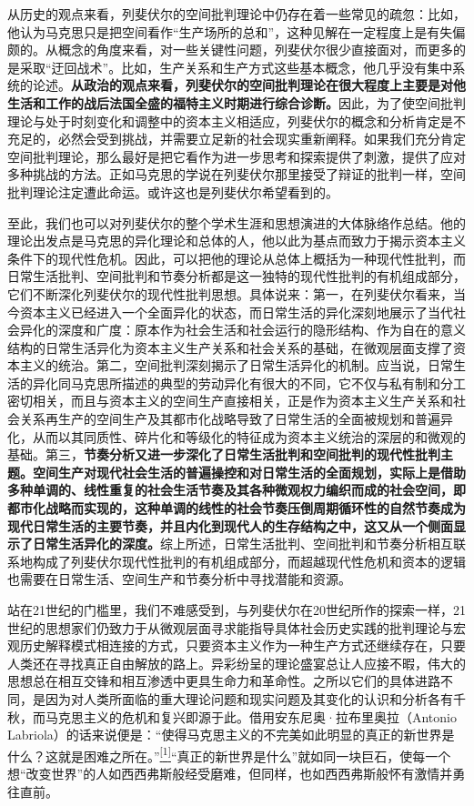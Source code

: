 \documentclass[UTF8, fontset = sourcesans, a4paper, oneside, zihao =
-4, scheme=chinese, no-math, space=true]{ctexbook}
\begin{document}
从历史的观点来看，列斐伏尔的空间批判理论中仍存在着一些常见的疏忽：比如，他认为马克思只是把空间看作``生产场所的总和''，这种见解在一定程度上是有失偏颇的。从概念的角度来看，对一些关键性问题，列斐伏尔很少直接面对，而更多的是采取``迂回战术''。比如，生产关系和生产方式这些基本概念，他几乎没有集中系统的论述。\textbf{从政治的观点来看，列斐伏尔的空间批判理论在很大程度上主要是对他生活和工作的战后法国全盛的福特主义时期进行综合诊断。}因此，为了使空间批判理论与处于时刻变化和调整中的资本主义相适应，列斐伏尔的概念和分析肯定是不充足的，必然会受到挑战，并需要立足新的社会现实重新阐释。如果我们充分肯定空间批判理论，那么最好是把它看作为进一步思考和探索提供了刺激，提供了应对多种挑战的方法。正如马克思的学说在列斐伏尔那里接受了辩证的批判一样，空间批判理论注定遭此命运。或许这也是列斐伏尔希望看到的。

至此，我们也可以对列斐伏尔的整个学术生涯和思想演进的大体脉络作总结。他的理论出发点是马克思的异化理论和总体的人，他以此为基点而致力于揭示资本主义条件下的现代性危机。因此，可以把他的理论从总体上概括为一种现代性批判，而日常生活批判、空间批判和节奏分析都是这一独特的现代性批判的有机组成部分，它们不断深化列斐伏尔的现代性批判思想。具体说来：第一，在列斐伏尔看来，当今资本主义已经进入一个全面异化的状态，而日常生活的异化深刻地展示了当代社会异化的深度和广度：原本作为社会生活和社会运行的隐形结构、作为自在的意义结构的日常生活异化为资本主义生产关系和社会关系的基础，在微观层面支撑了资本主义的统治。第二，空间批判深刻揭示了日常生活异化的机制。应当说，日常生活的异化同马克思所描述的典型的劳动异化有很大的不同，它不仅与私有制和分工密切相关，而且与资本主义的空间生产直接相关，正是作为资本主义生产关系和社会关系再生产的空间生产及其都市化战略导致了日常生活的全面被规划和普遍异化，从而以其同质性、碎片化和等级化的特征成为资本主义统治的深层的和微观的基础。第三，\textbf{节奏分析又进一步深化了日常生活批判和空间批判的现代性批判主题。空间生产对现代社会生活的普遍操控和对日常生活的全面规划，实际上是借助多种单调的、线性重复的社会生活节奏及其各种微观权力编织而成的社会空间，即都市化战略而实现的，这种单调的线性的社会节奏压倒周期循环性的自然节奏成为现代日常生活的主要节奏，并且内化到现代人的生存结构之中，这又从一个侧面显示了日常生活异化的深度。}综上所述，日常生活批判、空间批判和节奏分析相互联系地构成了列斐伏尔现代性批判的有机组成部分，而超越现代性危机和资本的逻辑也需要在日常生活、空间生产和节奏分析中寻找潜能和资源。

站在21世纪的门槛里，我们不难感受到，与列斐伏尔在20世纪所作的探索一样，21世纪的思想家们仍致力于从微观层面寻求能指导具体社会历史实践的批判理论与宏观历史解释模式相连接的方式，只要资本主义作为一种生产方式还继续存在，只要人类还在寻找真正自由解放的路上。异彩纷呈的理论盛宴总让人应接不暇，伟大的思想总在相互交锋和相互渗透中更具生命力和革命性。之所以它们的具体进路不同，是因为对人类所面临的重大理论问题和现实问题及其变化的认识和分析各有千秋，而马克思主义的危机和复兴即源于此。借用安东尼奥·拉布里奥拉（Antonio Labriola）的话来说便是：``使得马克思主义的不完美如此明显的真正的新世界是什么？这就是困难之所在。''\protect\hypertarget{part0011.htmlux5cux23w1}{}{}\protect\hyperlink{part0011.htmlux5cux23m1}{\textsuperscript{{[}1{]}}}``真正的新世界是什么''就如同一块巨石，使每一个想``改变世界''的人如西西弗斯般经受磨难，但同样，也如西西弗斯般怀有激情并勇往直前。
\end{document}
